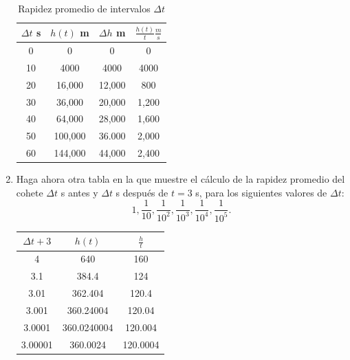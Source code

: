 \documentclass[12pt]{article}
\begin{document}
\begin{enumerate}
  \begin{table}[h]
  
    \begin{center}
  
        \begin{tabular}{| c | c | c |c|}\hline %
            $\Delta t$ s & $h(t)$ m & $\Delta h$ m&$\frac{h(t)}{t}\frac{m}{s}$\\ \hline
            0 & 0 & 0 &0 \\ 
            10& 4000& 4000& 4000 \\
            20&16,000&12,000&800\\
            30&36,000&20,000&1,200\\
            40&64,000&28,000&1,600\\
            50&100,000&36.000&2,000\\
            60& 144,000& 44,000& 2,400 \\ \hline
        \end{tabular}
    
    \caption{Rapidez promedio de intervalos $\Delta t$} 
    
    \label{tab:rapprom}
    
    \end{center}
  
  \end{table}

\item Haga ahora otra tabla en la que muestre el cálculo de la rapidez promedio del cohete $\Delta t$ s antes y $\Delta t$ s después de $t = 3$ s, para los siguientes valores de $\Delta t$:\[1,\frac{1}{10},\frac{1}{10^2},\frac{1}{10^3},\frac{1}{10^4},\frac{1}{10^5}.\]
  
    \begin{table}[h]
  
        \begin{center}
  
            \begin{minipage}{0.45\linewidth}
  
            \centering
  
                \begin{tabular}{| c | c | c |}\hline %
                  $\Delta t+3$  & $h(t)$  &$\frac{h}{t}$\\ \hline
                    4&640&160 \\
                    3.1&384.4&124\\
                    3.01&362.404&120.4\\
                    3.001&360.24004&120.04\\
                    3.0001&360.0240004&120.004\\
                    3.00001&360.0024&120.0004 \\ \hline
                \end{tabular}
            

\end{minipage}
\end{center}
\end{table}
\end{enumerate}
\end{document}
